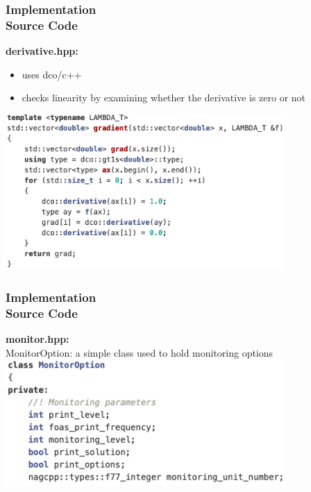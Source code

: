 \documentclass[ucs,10pt]{beamer}
\begin{document}
\begin{frame}
\frametitle{Implementation \\
\small \color{rwth-blue} Source Code}
\textbf{derivative.hpp:}\\ \vspace{1ex}
\begin{itemize}
	\item uses dco/c++
	\item checks linearity by examining whether the derivative is zero or not
\end{itemize}
\vspace{1em}
\includegraphics[width=0.8\textwidth]{code_derivative.png}
\end{frame}

\begin{frame}
\frametitle{Implementation \\
\small \color{rwth-blue} Source Code}
\textbf{monitor.hpp:}\\ \vspace{1ex}
MonitorOption: a simple class used to hold monitoring options\\
\vspace{1em}
\includegraphics[width=0.8\textwidth]{code_monitor.png}
\end{frame}
\end{document}
